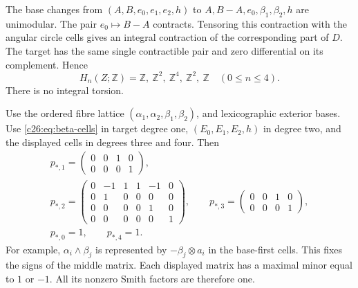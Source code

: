 The base changes from $(A,B,e_0,e_1,e_2,h)$ to
$A,B-A,e_0,\beta_1,\beta_2,h$ are unimodular.
The pair $e_0\mapsto B-A$ contracts.
Tensoring this contraction with the angular circle cells gives an
integral contraction of the corresponding part of $D$.
The target has the same single contractible pair and zero differential
on its complement. Hence
\begin{equation}\label{c26:eq:homology}
H_n(Z;\mathbb Z)=\mathbb Z,\ \mathbb Z^2,\ \mathbb Z^4,\
\mathbb Z^2,\ \mathbb Z
\quad(0\le n\le4).
\end{equation}
There is no integral torsion.

Use the ordered fibre lattice $(\alpha_1,\alpha_2,\beta_1,\beta_2)$,
and lexicographic exterior bases. Use \eqref{c26:eq:beta-cells} in target
degree one, $(E_0,E_1,E_2,h)$ in degree two, and the displayed cells
in degrees three and four. Then
\begin{equation}\label{c26:eq:homologyp}
\begin{gathered}
p_{*,1}=\begin{pmatrix}0&0&1&0\\0&0&0&1\end{pmatrix},\\
p_{*,2}=\begin{pmatrix}
0&-1&1&1&-1&0\\0&1&0&0&0&0\\0&0&0&0&1&0\\0&0&0&0&0&1
\end{pmatrix},\qquad
p_{*,3}=\begin{pmatrix}0&0&1&0\\0&0&0&1\end{pmatrix},\\
p_{*,0}=1,\qquad p_{*,4}=1.
\end{gathered}
\end{equation}
For example, $\alpha_i\wedge\beta_j$ is represented by
$-\beta_j\otimes a_i$ in the base-first cells.
This fixes the signs of the middle matrix.
Each displayed matrix has a maximal minor equal to $1$ or $-1$.
All its nonzero Smith factors are therefore one.

